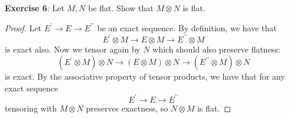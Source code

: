 \documentclass{article}
\begin{document}
\textbf{Exercise 6}: Let $M, N$ be flat. Show that $M \otimes N$ is flat.
    \begin{proof}
        Let $E^{\prime} \rightarrow E \rightarrow E^{\prime\prime}$ be an exact sequence. By definition, we have that
            \begin{equation*}
                E^{\prime} \otimes M \rightarrow E \otimes M \rightarrow E^{\prime\prime}\otimes M
            \end{equation*}
        is exact also. Now we tensor again by $N$ which should also preserve flatness:
            \begin{equation*}
                (E^{\prime} \otimes M) \otimes N \rightarrow (E \otimes M) \otimes N \rightarrow (E^{\prime\prime}\otimes M) \otimes N
            \end{equation*}
        is exact. By the associative property of tensor products, we have that for any exact sequence 
            \begin{equation*}
                E^{\prime} \rightarrow E \rightarrow E^{\prime\prime}
            \end{equation*}
        tensoring with $M \otimes N$ preserves exactness, so $N \otimes M$ is flat.
    \end{proof}
\end{document}
